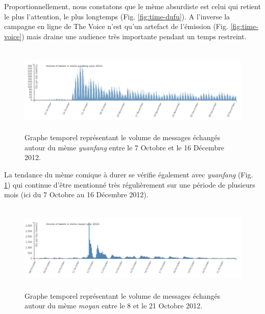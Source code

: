 Proportionnellement, nous constatons que le m\`eme absurdiste est celui qui retient le plus l{\textquoteright}attention, le plus longtemps (Fig. \ref{fig:time-dufu}). A l{\textquoteright}inverse la campagne en ligne de The Voice n{\textquoteright}est qu{\textquoteright}un artefact de l{\textquoteright}\'emission (Fig. \ref{fig:time-voice}) mais draine une audience tr\`es importante pendant un temps restreint. 

\begin{figure}[h!]
    \centering
    
  \includegraphics[width=6.0087in,height=1.6697in]{figures/chap4/chapitre4-img5.png}
  
  \caption{
   Graphe temporel repr\'esentant le volume de messages \'echang\'es  autour du m\`eme \textit{yuanfang} entre le 7 Octobre et le 16 D\'ecembre 2012.
  }
  \label{fig:time-yuanfang}
\end{figure}

La tendance du m\`eme comique \`a durer se v\'erifie \'egalement avec
\textit{yuanfang} (Fig. \ref{fig:time-yuanfang}) qui continue d{\textquoteright}\^etre mentionn\'e
tr\`es r\'eguli\`erement sur une p\'eriode de plusieurs mois (ici du 7
Octobre au 16 D\'ecembre 2012).

\begin{figure}[h!]
    \centering
    \includegraphics[width=6.0087in,height=1.6697in]{figures/chap4/chapitre4-img6.png}
    \caption{
      Graphe temporel repr\'esentant le volume de messages \'echang\'es autour du m\`eme \textit{moyan} entre le 8 et le 21 Octobre 2012.
    }
    \label{fig:time-moyan}
\end{figure}

